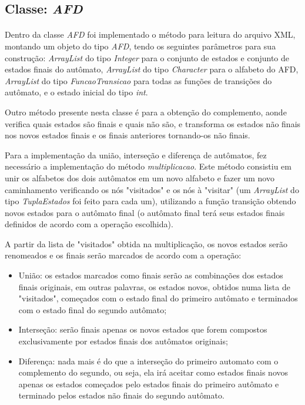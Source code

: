 \documentclass[a4paper,portuguese,12pt]{article}
\begin{document}
\subsection{Classe: \textit{AFD}}
\paragraph{}Dentro da classe \textit{AFD} foi implementado o método para leitura do arquivo XML, montando um objeto do tipo \textit{AFD}, tendo os seguintes parâmetros para sua construção: \textit{ArrayList} do tipo \textit{Integer} para o conjunto de estados e conjunto de estados finais do autômato, \textit{ArrayList} do tipo \textit{Character} para o alfabeto do AFD, \textit{ArrayList} do tipo \textit{FuncaoTransicao} para todas as funções de transições do autômato, e o estado inicial do tipo \textit{int}.

Outro método presente nesta classe é para a obtenção do complemento, aonde verifica quais estados são finais e quais não são, e transforma os estados não finais nos novos estados finais e os finais anteriores tornando-os não finais.

Para a implementação  da união, interseção e diferença de autômatos, fez necessário a implementação do método \textit{multiplicacao}. Este método consistiu em unir os alfabetos dos dois autômatos em um novo alfabeto e fazer um novo caminhamento verificando os nós "visitados" e os nós à "visitar" (um \textit{ArrayList} do tipo \textit{TuplaEstados} foi feito para cada um), utilizando a função transição obtendo novos estados para o autômato final (o autômato final terá seus estados finais definidos de acordo com a operação escolhida).

A partir da lista de "visitados" obtida na multiplicação, os novos estados serão renomeados e os finais serão marcados de acordo com a operação: 
\begin{itemize}
	\item União: os estados marcados como finais serão as combinações dos estados finais originais, em outras palavras, os estados novos, obtidos numa lista de "visitados", começados com o estado final do primeiro autômato e terminados com o estado final do segundo autômato;
	\item Interseção: serão finais apenas os novos estados que forem compostos exclusivamente por estados finais dos autômatos originais;
	\item Diferença: nada mais é do que a interseção do primeiro automato com o complemento do segundo, ou seja, ela irá aceitar como estados finais novos apenas os estados começados pelo estados finais do primeiro autômato e terminado pelos estados não finais do segundo autômato.
\end{itemize}
\end{document}
